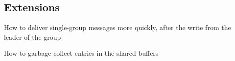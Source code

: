 


\subsection{Extensions}
\label{sec:extensions}

How to deliver single-group messages more quickly, after the write from the leader of the group

How to garbage collect entries in the shared buffers
